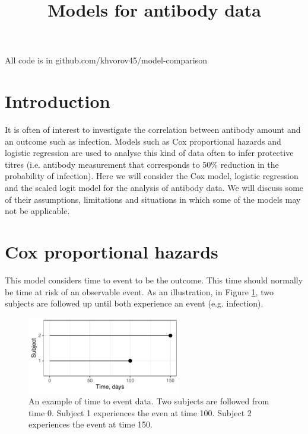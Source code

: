 \documentclass[12pt]{article}
\title{Models for antibody data}
\begin{document}
\maketitle


All code is in github.com/khvorov45/model-comparison

%
\section{Introduction}

It is often of interest to investigate the correlation between antibody amount and an outcome such as infection. Models such as Cox proportional hazards and logistic regression are used to analyse this kind of data often to infer protective titres (i.e. antibody measurement that corresponds to 50\% reduction in the probability of infection). Here we will consider the Cox model, logistic regression and the scaled logit model for the analysis of antibody data. We will discuss some of their assumptions, limitations and situations in which some of the models may not be applicable.

\pagebreak
%
\section{Cox proportional hazards}

This model considers time to event to be the outcome. This time should normally be time at risk of an observable event. As an illustration, in Figure \ref{CoxExampleFull}, two subjects are followed up until both experience an event (e.g. infection).

\begin{figure}[htp]
	\centering
	\includegraphics[width=0.6\textwidth]{../curve-cox/timeplot_1_light.pdf}
	\caption{
	An example of time to event data. Two subjects are followed from time 0. Subject 1 experiences the even at time 100. Subject 2 experiences the event at time 150.
	}
	\label{CoxExampleFull}
\end{figure}
\end{document}
